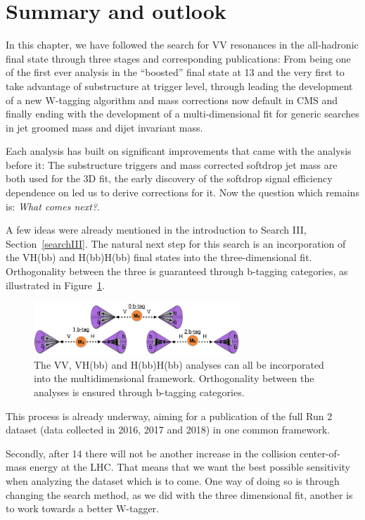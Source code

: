 \clearpage

\section{Summary and outlook}
\label{sec:outlook}
In this chapter, we have followed the search for VV resonances in the all-hadronic final state through three stages and corresponding publications: From being one of the first ever analysis in the ``boosted'' final state at 13 \TeV and the very first to take advantage of substructure at trigger level, through leading the development of a new W-tagging algorithm and mass corrections now default in CMS and finally ending with the development of a multi-dimensional fit for generic searches in jet groomed mass and dijet invariant mass.\par
Each analysis has built on significant improvements that came with the analysis before it: The substructure triggers and mass corrected softdrop jet mass are both used for the 3D fit, the early discovery of the softdrop signal efficiency dependence on \PT led us to derive corrections for it. Now the question which remains is: \emph{What comes next?}.\par
A few ideas were already mentioned in the introduction to Search III, Section~\ref{searchIII}. The natural next step for this search is an incorporation of the VH(bb) and H(bb)H(bb) final states into the three-dimensional fit. Orthogonality between the three is guaranteed through b-tagging categories, as illustrated in Figure~\ref{fig:outlook:vvvhhh}.
\begin{figure}[h!]
\centering
\includegraphics[width=0.69\textwidth]{figures/analysis/search3/misc/VVVHHH.png}
\caption{The VV, VH(bb) and H(bb)H(bb) analyses can all be incorporated into the multidimensional framework. Orthogonality between the analyses is ensured through b-tagging categories.}
\label{fig:outlook:vvvhhh}
\end{figure}
This process is already underway, aiming for a publication of the full Run 2 dataset (data collected in 2016, 2017 and 2018) in one common framework.\par
Secondly, after 14 \TeV there will not be another increase in the collision center-of-mass energy at the LHC. That means that we want the best possible sensitivity when analyzing the dataset which is to come. One way of doing so is through changing the search method, as we did with the three dimensional fit, another is to work towards a better W-tagger.\par

